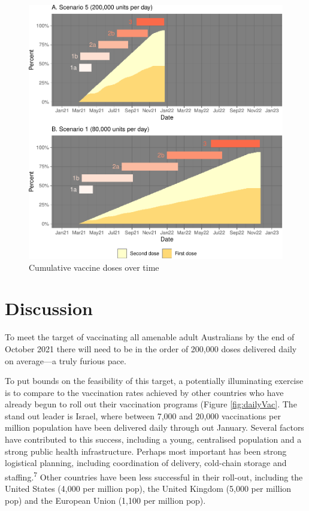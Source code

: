 \documentclass{article}
\begin{document}
\begin{figure}

{\centering \includegraphics{researchNote_files/figure-latex/cumlResults-1} 

}

\caption{Cumulative vaccine doses over time}\label{fig:cumlResults}
\end{figure}

\hypertarget{discussion}{%
\section{Discussion}\label{discussion}}

To meet the target of vaccinating all amenable adult Australians by the
end of October 2021 there will need to be in the order of 200,000 doses
delivered daily on average---a truly furious pace.

To put bounds on the feasibility of this target, a potentially
illuminating exercise is to compare to the vaccination rates achieved by
other countries who have already begun to roll out their vaccination
programs (Figure \ref{fig:dailyVac}. The stand out leader is Israel,
where between 7,000 and 20,000 vaccinations per million population have
been delivered daily through out January. Several factors have
contributed to this success, including a young, centralised population
and a strong public health infrastructure. Perhaps most important has
been strong logistical planning, including coordination of delivery,
cold-chain storage and staffing.\textsuperscript{7} Other countries have
been less successful in their roll-out, including the United States
(4,000 per million pop), the United Kingdom (5,000 per million pop) and
the European Union (1,100 per million pop).
\end{document}
